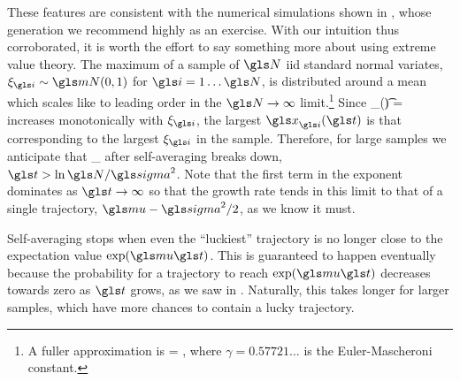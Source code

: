 These features are consistent with the numerical simulations shown in , whose generation we recommend highly as an exercise. With our intuition thus corroborated, it is worth the effort to say something more about  using extreme value theory. The maximum of a sample of $\N$ iid standard normal variates, $\xi_\gi\sim\mN(0,1)$ for $\gi=1\dots\N$, is distributed around a mean which scales like
\be
{} \approx \sqrt{2\ln\N}
\ee
to leading order in the $\N\to\infty$ limit.\footnote{A fuller approximation is
\be
{} = ,
\ee
where $\gamma=0.57721\dots$ is the Euler-Mascheroni constant.} Since
\be
\x_\gi(\t) = \exp{}
\ee
increases monotonically with $\xi_\gi$, the largest $\x_\gi(\t)$ is that corresponding to the largest $\xi_\gi$ in the sample. Therefore, for large samples we anticipate that
\be
\ave{\x(\t)}_\N \approx {} \exp{}
\ee
after self-averaging breaks down, $\t>\ln\N/\gsigma^2$. Note that the first term in the exponent dominates as $\t\to\infty$ so that the growth rate tends in this limit to that of a single trajectory, $\gmu-\gsigma^2/2$, as we know it must.

Self-averaging stops when even the ``luckiest'' trajectory is no longer close to the expectation value $\exp(\gmu \t)$. This is guaranteed to happen eventually because the probability for a trajectory to reach $\exp(\gmu \t)$ decreases towards zero as $\t$ grows, as we saw in . Naturally, this takes longer for larger samples, which have more chances to contain a lucky trajectory. 

